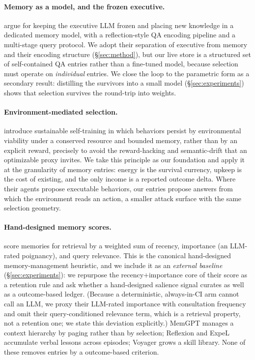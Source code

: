 \paragraph{Memory as a model, and the frozen executive.}
\citet{quek2026memo} argue for keeping the executive LLM frozen and
placing new knowledge in a dedicated memory model, with a
reflection-style QA encoding pipeline and a multi-stage query protocol.
We adopt their separation of executive from memory and their encoding
structure (\S\ref{sec:method}), but our live store is a structured set of
self-contained QA entries rather than a fine-tuned model, because
selection must operate on \emph{individual} entries. We close the loop to
the parametric form as a secondary result: distilling the survivors into
a small model (\S\ref{sec:experiments}) shows that selection survives the
round-trip into weights.

\paragraph{Environment-mediated selection.}
\citet{dodgson2026survival} introduce sustainable self-training in which
behaviors persist by environmental viability under a conserved resource
and bounded memory, rather than by an explicit reward, precisely to avoid
the reward-hacking and semantic-drift that an optimizable proxy invites.
We take this principle as our foundation and apply it at the granularity
of memory entries: energy is the survival currency, upkeep is the cost of
existing, and the only income is a reported outcome delta.
Where their agents propose executable behaviors, our entries propose
answers from which the environment reads an action, a smaller attack
surface with the same selection geometry.

\paragraph{Hand-designed memory scores.}
\citet{park2023generative} score memories for retrieval by a weighted sum
of recency, importance (an LLM-rated poignancy), and query relevance.
This is the canonical hand-designed memory-management heuristic, and we
include it as an \emph{external baseline} (\S\ref{sec:experiments}): we
repurpose the recency$+$importance core of their score as a retention
rule and ask whether a hand-designed salience signal curates as well as a
outcome-based ledger. (Because a deterministic, always-in-CI arm
cannot call an LLM, we proxy their LLM-rated importance with consultation
frequency and omit their query-conditioned relevance term, which is a
retrieval property, not a retention one; we state this deviation
explicitly.) MemGPT \citep{packer2023memgpt} manages a context hierarchy
by paging rather than by selection; Reflexion \citep{shinn2023reflexion}
and ExpeL \citep{zhao2024expel} accumulate verbal lessons across episodes;
Voyager \citep{wang2023voyager} grows a skill library. None of these
removes entries by a outcome-based criterion.

